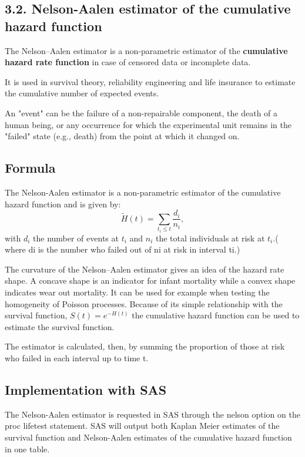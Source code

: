 \documentclass[]{article}
\title{}
\author{}
\begin{document}
	
\subsection*{3.2. Nelson-Aalen estimator of the cumulative hazard function}

The Nelson–Aalen estimator is a non-parametric estimator of the \textbf{cumulative hazard rate function} in case of censored data or incomplete data.


It is used in survival theory, reliability engineering and life insurance to estimate the cumulative number of expected events. 


An "event" can be the failure of a non-repairable component, the death of a human being, or any occurrence for which the experimental unit remains in the "failed" state (e.g., death) from the point at which it changed on. 

\subsection*{Formula}
The Nelson-Aalen estimator is a non-parametric estimator of the cumulative hazard function and is given by:
\[\tilde{H}(t)=\sum_{t_i\leq t}\frac{d_i}{n_i},\]
with $d_i$ the number of events at $t_i$ and $n_i$ the total individuals at risk at $t_i$.( %
where di is the number who failed out of ni at risk in interval ti.)

The curvature of the Nelson–Aalen estimator gives an idea of the hazard rate shape. A concave shape is an indicator for infant mortality while a convex shape indicates wear out mortality.
It can be used for example when testing the homogeneity of Poisson processes.
Because of its simple relationship with the survival function, $S(t)=e^{−H(t)}$ the cumulative hazard function can be used to estimate the survival function. 

 The estimator is calculated, then, by summing the proportion of those at risk who failed in each interval up to time t.

\subsection*{Implementation with SAS}
The Nelson-Aalen estimator is requested in SAS through the nelson option on the proc lifetest statement. SAS will output both Kaplan Meier estimates of the survival function and Nelson-Aalen estimates of the cumulative hazard function in one table.
\end{document}
